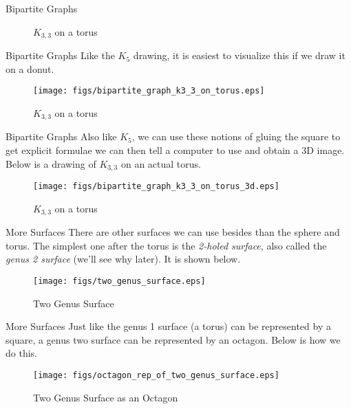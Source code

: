 \documentclass{beamer}
\begin{document}
    \begin{frame}{Bipartite Graphs}
        \begin{figure}
            \centering
            \caption{$K_{3,3}$ on a torus}
            \label{fig:K3_3_torus_plane}
        \end{figure}
    \end{frame}
    \begin{frame}{Bipartite Graphs}
        Like the $K_{5}$ drawing, it is easiest to visualize this if we draw it on a donut.
        \begin{figure}
            \centering
            \texttt{[image: figs/bipartite\_graph\_k3\_3\_on\_torus.eps]}
            \caption{$K_{3,3}$ on a torus}
            \label{fig:bipartite_graph_k3_3_on_torus}
        \end{figure}
    \end{frame}
    \begin{frame}{Bipartite Graphs}
        Also like $K_{5}$, we can use these notions of gluing the square to get explicit
        formulae we can then tell a computer to use and obtain a 3D image. Below is
        a drawing of $K_{3,3}$ on an actual torus.
        \begin{figure}
            \centering
            \texttt{[image: figs/bipartite\_graph\_k3\_3\_on\_torus\_3d.eps]}
            \caption{$K_{3,3}$ on a torus}
            \label{fig:bipartite_graph_k3_3_on_torus_3d}
        \end{figure}
    \end{frame}
    \begin{frame}{More Surfaces}
        There are other surfaces we can use besides than the sphere and torus.
        The simplest one after the torus is the \textit{2-holed surface}, also called
        the \textit{genus 2 surface} (we'll see why later). It is shown below.
        \begin{figure}
            \centering
            \texttt{[image: figs/two\_genus\_surface.eps]}
            \caption{Two Genus Surface}
            \label{fig:two_genus_surface}
        \end{figure}
    \end{frame}
    \begin{frame}{More Surfaces}
        Just like the genus 1 surface (a torus) can be represented by a square,
        a genus two surface can be represented by an octagon. Below is how we do this.
        \begin{figure}
            \centering
            \texttt{[image: figs/octagon\_rep\_of\_two\_genus\_surface.eps]}
            \caption{Two Genus Surface as an Octagon}
            \label{fig:two_genus_surface_octagon_rep}
        \end{figure}
    \end{frame}
\end{document}

